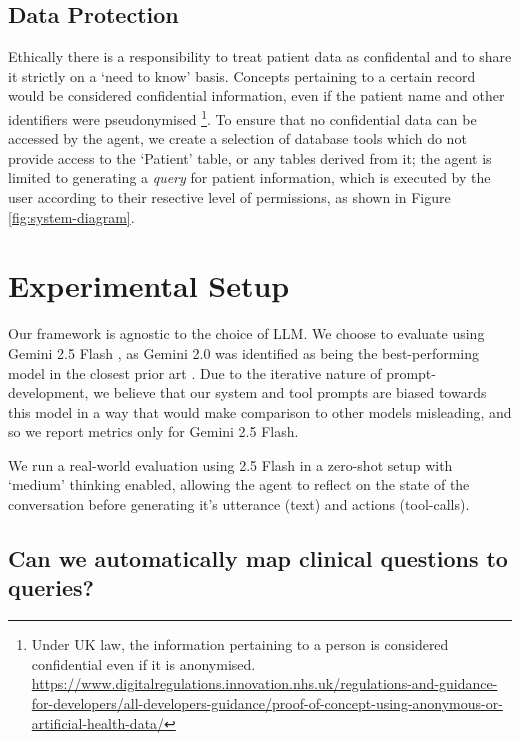 \documentclass[11pt]{article}
\begin{document}
\subsection{Data Protection} 
Ethically there is a responsibility to treat patient data as confidental and to share it strictly on a `need to know' basis.
Concepts pertaining to a certain record would be considered confidential information, even if the patient name and other identifiers were pseudonymised
\footnote{Under UK law, the information pertaining to a person is considered confidential even if it is anonymised.
\url{https://www.digitalregulations.innovation.nhs.uk/regulations-and-guidance-for-developers/all-developers-guidance/proof-of-concept-using-anonymous-or-artificial-health-data/}
}. 
To ensure that no confidential data can be accessed by the agent, we create a selection of database tools which do not provide access to the `Patient' table, or any tables derived from it; the agent is limited to generating a \textit{query} for patient information, which is executed by the user according to their resective level of permissions, as shown in Figure \ref{fig:system-diagram}.


\section{Experimental Setup}
Our framework is agnostic to the choice of LLM. We choose to evaluate using Gemini 2.5 Flash \citet{comanici_gemini_2025}, as Gemini 2.0 was identified as being the best-performing model in the closest prior art \citet{ziletti_generating_2025}.
Due to the iterative nature of prompt-development, we believe that our system and tool prompts are biased towards this model in a way that would make comparison to other models misleading, and so we report metrics only for Gemini 2.5 Flash.

We run a real-world evaluation using 2.5 Flash in a zero-shot setup with `medium' thinking enabled, allowing the agent to reflect on the state of the conversation before generating it's utterance (text) and actions (tool-calls).

\subsection*{Can we automatically map clinical questions to queries?}
\end{document}
